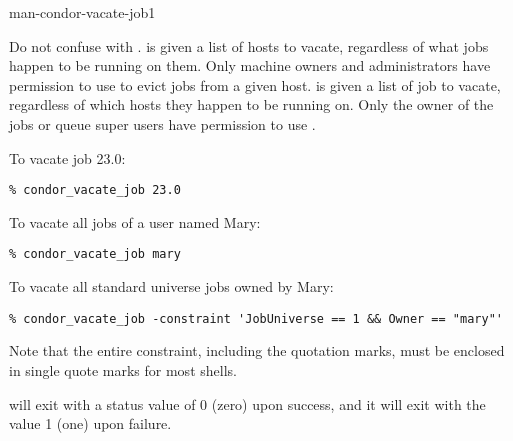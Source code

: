 \begin{ManPage}{}{man-condor-vacate-job}{1}
\GenRem

Do not confuse  with .
 is given a list of hosts to vacate, regardless of what
jobs happen to be running on them.
Only machine owners and administrators have permission to use
 to evict jobs from a given host.
 is given a list of job to vacate, regardless of
which hosts they happen to be running on.
Only the owner of the jobs or queue super users have permission to use
.

\Examples

To vacate job 23.0:
\begin{verbatim}
% condor_vacate_job 23.0
\end{verbatim}

To vacate all jobs of a user named Mary:
\begin{verbatim}
% condor_vacate_job mary 
\end{verbatim}

To vacate all standard universe jobs owned by Mary:
\footnotesize
\begin{verbatim}
% condor_vacate_job -constraint 'JobUniverse == 1 && Owner == "mary"'
\end{verbatim}
\normalsize
Note that the entire constraint, including the quotation marks, must
be enclosed in single quote marks for most shells.

\ExitStatus

 will exit with a status value of 0 (zero) upon success,
and it will exit with the value 1 (one) upon failure.

\end{ManPage}
